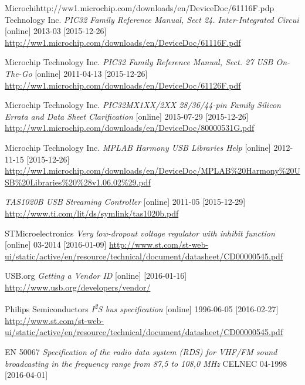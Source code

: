 \documentclass[czech,master,public,dept460,male,cpdeclaration]{diploma}	%
\newcommand{\iis}{I\textsuperscript{2}S }
\begin{document}
\begin{thebibliography}{99}

 Microchihttp://ww1.microchip.com/downloads/en/DeviceDoc/61116F.pdp Technology Inc.
\textit{PIC32 Family Reference Manual,  Sect 24. Inter-Integrated Circui} [online] 2013-03 [2015-12-26]
\url{http://ww1.microchip.com/downloads/en/DeviceDoc/61116F.pdf}


 Microchip Technology Inc.
\textit{PIC32 Family Reference Manual, Sect. 27 USB On-The-Go} [online] 2011-04-13 [2015-12-26]
\url{http://ww1.microchip.com/downloads/en/DeviceDoc/61126F.pdf}

 Microchip Technology Inc.
\textit{PIC32MX1XX/2XX 28/36/44-pin Family Silicon Errata and Data Sheet Clarification} [online] 2015-07-29 [2015-12-26]
\url{http://ww1.microchip.com/downloads/en/DeviceDoc/80000531G.pdf}

 Microchip Technology Inc.
\textit{MPLAB Harmony USB Libraries Help} [online] 2012-11-15 [2015-12-26]
\url{http://ww1.microchip.com/downloads/en/DeviceDoc/MPLAB\%20Harmony\%20USB\%20Libraries\%20\%28v1.06.02\%29.pdf}

\textit{TAS1020B USB Streaming Controller} [online] 2011-05 [2015-12-29]
\url{http://www.ti.com/lit/ds/symlink/tas1020b.pdf} 

 STMicroelectronics
\textit{Very low-dropout voltage regulator with inhibit function} [online] 03-2014 [2016-01-09]
\url{http://www.st.com/st-web-ui/static/active/en/resource/technical/document/datasheet/CD00000545.pdf}

 USB.org
\textit{Getting a Vendor ID} [online] [2016-01-16]
\url{http://www.usb.org/developers/vendor/}

 Philips Semiconductors
\textit{\iis bus specification} [online] 1996-06-05 [2016-02-27]
\url{http://www.st.com/st-web-ui/static/active/en/resource/technical/document/datasheet/CD00000545.pdf}

 EN 50067
\textit{Specification of the radio data system (RDS) for VHF/FM sound broadcasting in the frequency range from 87,5 to 108,0 MHz} CELNEC 04-1998 [2016-04-01]


\end{thebibliography}
\end{document}
